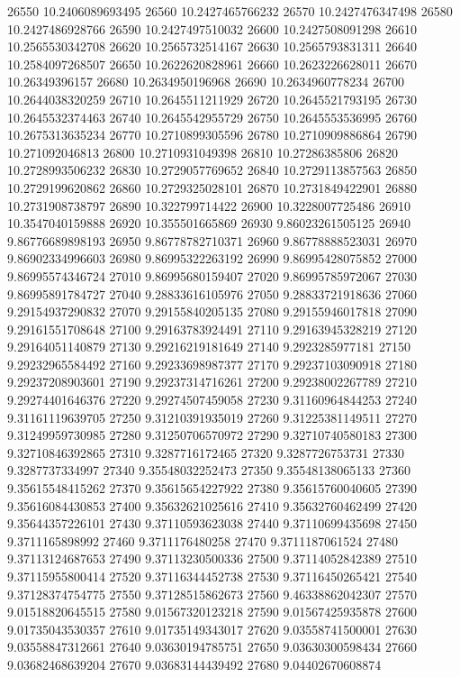 {26550 10.2406089693495
26560 10.2427465766232
26570 10.2427476347498
26580 10.2427486928766
26590 10.2427497510032
26600 10.2427508091298
26610 10.2565530342708
26620 10.2565732514167
26630 10.2565793831311
26640 10.2584097268507
26650 10.2622620828961
26660 10.2623226628011
26670 10.26349396157
26680 10.2634950196968
26690 10.2634960778234
26700 10.2644038320259
26710 10.2645511211929
26720 10.2645521793195
26730 10.2645532374463
26740 10.2645542955729
26750 10.2645553536995
26760 10.2675313635234
26770 10.2710899305596
26780 10.2710909886864
26790 10.271092046813
26800 10.2710931049398
26810 10.27286385806
26820 10.2728993506232
26830 10.2729057769652
26840 10.2729113857563
26850 10.2729199620862
26860 10.2729325028101
26870 10.2731849422901
26880 10.2731908738797
26890 10.322799714422
26900 10.3228007725486
26910 10.3547040159888
26920 10.355501665869
26930 9.86023261505125
26940 9.86776689898193
26950 9.86778782710371
26960 9.86778888523031
26970 9.86902334996603
26980 9.86995322263192
26990 9.86995428075852
27000 9.86995574346724
27010 9.86995680159407
27020 9.86995785972067
27030 9.86995891784727
27040 9.28833616105976
27050 9.28833721918636
27060 9.29154937290832
27070 9.29155840205135
27080 9.29155946017818
27090 9.29161551708648
27100 9.29163783924491
27110 9.29163945328219
27120 9.29164051140879
27130 9.29216219181649
27140 9.2923285977181
27150 9.29232965584492
27160 9.29233698987377
27170 9.29237103090918
27180 9.29237208903601
27190 9.29237314716261
27200 9.29238002267789
27210 9.29274401646376
27220 9.29274507459058
27230 9.31160964844253
27240 9.31161119639705
27250 9.31210391935019
27260 9.31225381149511
27270 9.31249959730985
27280 9.31250706570972
27290 9.32710740580183
27300 9.32710846392865
27310 9.3287716172465
27320 9.3287726753731
27330 9.3287737334997
27340 9.35548032252473
27350 9.35548138065133
27360 9.35615548415262
27370 9.35615654227922
27380 9.35615760040605
27390 9.35616084430853
27400 9.35632621025616
27410 9.35632760462499
27420 9.35644357226101
27430 9.37110593623038
27440 9.37110699435698
27450 9.3711165898992
27460 9.3711176480258
27470 9.3711187061524
27480 9.37113124687653
27490 9.37113230500336
27500 9.37114052842389
27510 9.37115955800414
27520 9.37116344452738
27530 9.37116450265421
27540 9.37128374754775
27550 9.37128515862673
27560 9.46338862042307
27570 9.01518820645515
27580 9.01567320123218
27590 9.01567425935878
27600 9.01735043530357
27610 9.01735149343017
27620 9.03558741500001
27630 9.03558847312661
27640 9.03630194785751
27650 9.03630300598434
27660 9.03682468639204
27670 9.03683144439492
27680 9.04402670608874
}

